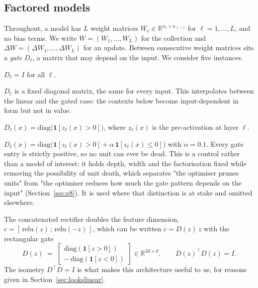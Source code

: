 \documentclass{article} %
\theoremstyle{plain}
\theoremstyle{definition}
\theoremstyle{remark}
\begin{document}
\subsection{Factored models}
\label{sec:models}

Throughout, a model has $L$ weight matrices $W_\ell \in \mathbb{R}^{n_\ell \times n_{\ell-1}}$ for
$\ell = 1,\dots,L$, and no bias terms. We write $W = (W_1,\dots,W_L)$ for the collection and
$\Delta W = (\Delta W_1,\dots,\Delta W_L)$ for an update. Between consecutive weight matrices sits
a \emph{gate} $D_\ell$, a matrix that may depend on the input. We consider five instances.

\begin{description}[leftmargin=*,itemsep=2pt,topsep=3pt]
  \item[Deep linear network (DLN).] $D_\ell = I$ for all $\ell$.
  \item[Fixed-gate linear network (FGLN).] $D_\ell$ is a fixed diagonal matrix, the same for every
        input. This interpolates between the linear and the gated case: the contexts below become
        input-dependent in form but not in value.
  \item[ReLU multilayer perceptron.] $D_\ell(x) = \mathrm{diag}\big(\mathbf{1}[z_\ell(x) > 0]\big)$,
        where $z_\ell(x)$ is the pre-activation at layer $\ell$.
  \item[Leaky ReLU multilayer perceptron.] $D_\ell(x) = \mathrm{diag}\big(\mathbf{1}[z_\ell(x)>0]
        + \alpha\,\mathbf{1}[z_\ell(x)\le 0]\big)$ with $\alpha = 0.1$. Every gate entry is
        strictly positive, so no unit can ever be dead. This is a control rather than a model of
        interest: it holds depth, width and the factorisation fixed while removing the possibility
        of unit death, which separates "the optimiser prunes units" from "the optimiser reduces
        how much the gate pattern depends on the input" (Section~\ref{sec:e8}). It is used where
        that distinction is at stake and omitted elsewhere.
  \item[CReLU multilayer perceptron.] The concatenated rectifier \citep{shang2016crelu} doubles the
        feature dimension,
        $c = [\,\mathrm{relu}(z)\,;\,\mathrm{relu}(-z)\,]$, which can be written $c = D(z)\,z$ with
        the rectangular gate
        \begin{equation}
          D(z) \;=\; \begin{bmatrix} \mathrm{diag}(\mathbf{1}[z>0]) \\[2pt]
                                     -\,\mathrm{diag}(\mathbf{1}[z<0]) \end{bmatrix}
          \in \mathbb{R}^{2d \times d},
          \qquad D(z)^\top D(z) = I .
          \label{eq:crelu}
        \end{equation}
        The isometry $D^\top D = I$ is what makes this architecture useful to us, for reasons
        given in Section~\ref{sec:lookslinear}.
\end{description}
\end{document}
